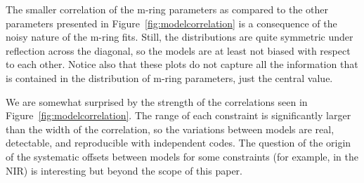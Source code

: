 The smaller correlation of the m-ring parameters as compared to the other parameters presented in Figure~\ref{fig:modelcorrelation} is a consequence of the noisy nature of the m-ring fits.  Still, the distributions are quite symmetric under reflection across the diagonal, so the models are at least not biased with respect to each other.  Notice also that these plots do not capture all the information that is contained in the distribution of m-ring parameters, just the central value.

We are somewhat surprised by the strength of the correlations seen in Figure~\ref{fig:modelcorrelation}.  The range of each constraint is significantly larger than the width of the correlation, so the variations between models are real, detectable, and reproducible with independent codes.  The question of the origin of the systematic offsets between models for some constraints (for example, in the NIR) is interesting but beyond the scope of this paper.





